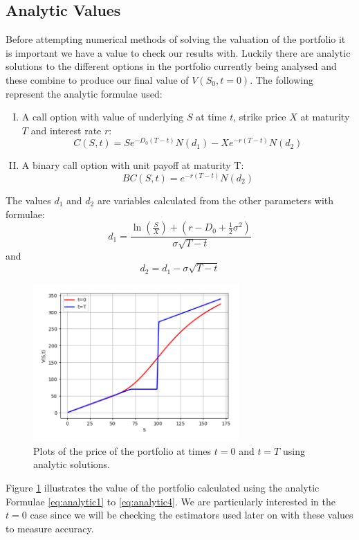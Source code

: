 \documentclass{article}
\begin{document}
\subsection*{Analytic Values}
Before attempting numerical methods of solving the valuation of the portfolio it is important we have a value
to check our results with. Luckily there are analytic solutions to the different options in the portfolio currently being
analysed and these combine to produce our final value of $V(S_0,t=0)$. The following represent the analytic formulae used:
\begin{enumerate}[I)]
  \item A call option with value of underlying $S$ at time $t$, strike price $X$ at maturity $T$ and interest rate $r$:
  \begin{equation}
    C(S,t)=Se^{-D_0(T-t)}N(d_1)-Xe^{-r(T-t)}N(d_2)
    \label{eq:analytic1}
  \end{equation}
  \item A binary call option with unit payoff at maturity T:
  \begin{equation}
    BC(S,t)=e^{-r(T-t)}N(d_2)
     \label{eq:analytic2}
  \end{equation}
\end{enumerate}
  The values $d_1$ and $d_2$ are variables calculated from the other parameters with formulae:
  \begin{equation}
    d_1= \frac{\ln(\frac{S}{X})+(r-D_0+\frac{1}{2}\sigma^{2})}{\sigma\sqrt{T-t}}
     \label{eq:analytic3}
  \end{equation}
  and
  \begin{equation}
     d_2= d_1- \sigma\sqrt{T-t}
      \label{eq:analytic4}
  \end{equation}
\begin{figure}[!th]
\includegraphics[width=0.7\textwidth,center]{analytic_values.png}
\caption{Plots of the price of the portfolio at times $t=0$ and $t=T$ using analytic solutions.}
\label{fig:analytic_values}
\end{figure}
Figure \ref{fig:analytic_values} illustrates the value of the portfolio calculated using the analytic Formulae \ref{eq:analytic1} to \ref{eq:analytic4}. We are particularly interested in the $t=0$ case since we will be checking the estimators used later on with these values to measure accuracy.
\end{document}
